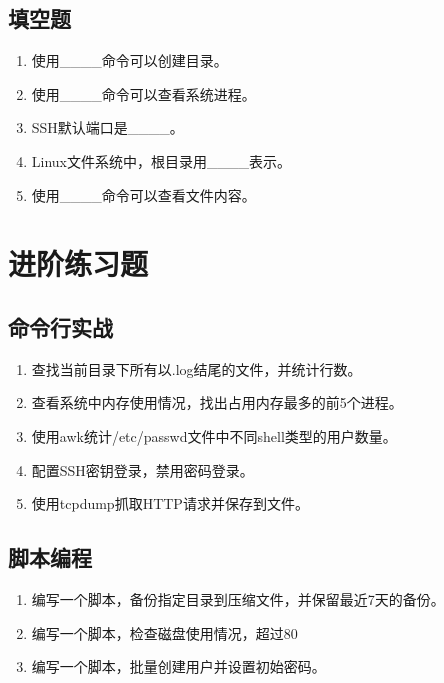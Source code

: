 \documentclass[12pt,UTF8]{ctexbook}
\begin{document}
\subsection*{填空题}

\begin{enumerate}
    \item 使用\_\_\_\_命令可以创建目录。
    \item 使用\_\_\_\_命令可以查看系统进程。
    \item SSH默认端口是\_\_\_\_。
    \item Linux文件系统中，根目录用\_\_\_\_表示。
    \item 使用\_\_\_\_命令可以查看文件内容。
\end{enumerate}

\section{进阶练习题}
\label{sec:advanced-exercises}

\subsection*{命令行实战}

\begin{enumerate}
    \item 查找当前目录下所有以.log结尾的文件，并统计行数。
    \item 查看系统中内存使用情况，找出占用内存最多的前5个进程。
    \item 使用awk统计/etc/passwd文件中不同shell类型的用户数量。
    \item 配置SSH密钥登录，禁用密码登录。
    \item 使用tcpdump抓取HTTP请求并保存到文件。
\end{enumerate}

\subsection*{脚本编程}

\begin{enumerate}
    \item 编写一个脚本，备份指定目录到压缩文件，并保留最近7天的备份。
    \item 编写一个脚本，检查磁盘使用情况，超过80%
    \item 编写一个脚本，批量创建用户并设置初始密码。
\end{enumerate}
\end{document}
